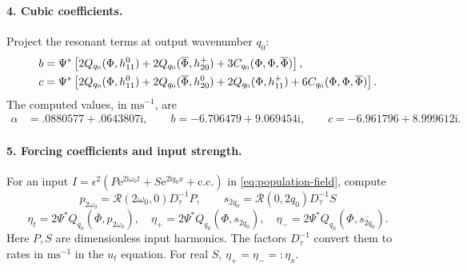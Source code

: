 \documentclass[11pt]{article}
\newcommand{\ii}{\mathrm{i}}
\newcommand{\ee}{\mathrm{e}}
\newcommand{\cR}{\mathcal{R}}
\newcommand{\cc}{\mathrm{c.c.}}
\begin{document}
\paragraph{4. Cubic coefficients.}
Project the resonant terms at output wavenumber $q_0$:
\begin{align}
 b={}&\Psi^*\left[2Q_{q_0}(\Phi,h_{11}^0)
       +2Q_{q_0}(\overline\Phi,h_{20}^+)
       +3C_{q_0}(\Phi,\Phi,\overline\Phi)\right],\notag\\
 c={}&\Psi^*\left[2Q_{q_0}(\Phi,h_{11}^0)
       +2Q_{q_0}(\overline\Phi,h_{20}^0)
       +2Q_{q_0}(\Phi,h_{11}^+)
       +6C_{q_0}(\Phi,\Phi,\overline\Phi)\right].
 \label{eq:v1-cubic-computation}
\end{align}
The computed values, in $\mathrm{ms}^{-1}$, are
\begin{equation}
 \begin{split}
 \alpha&=.0880577+.0643807\ii,\qquad 
 b=-6.706479+9.069454\ii,\qquad
 c=-6.961796+8.999612\ii.
 \end{split}
 \label{eq:v1-computed-coefficients}
\end{equation}

\paragraph{5. Forcing coefficients and input strength.}
For an input
$I=\epsilon^2(P\ee^{2\ii\omega_0t}+S\ee^{2\ii q_0x}+\cc)$
in \eqref{eq:population-field}, compute
\begin{equation}
      p_{2\omega_0}=\cR(2\omega_0,0)D_\tau^{-1}P,\qquad 
 s_{2q_0}=\cR(0,2q_0)D_\tau^{-1}S
\end{equation}
\begin{equation}
      \eta_t=2\Psi^*Q_{q_0}(\overline\Phi,p_{2\omega_0}),\quad
 \eta_+=2\Psi^*Q_{q_0}(\Phi,s_{2q_0}),\quad
 \eta_-=2\Psi^*Q_{q_0}(\Phi,\overline{s_{2q_0}}).
\end{equation}
Here $P,S$ are dimensionless input harmonics. The factors $D_\tau^{-1}$
convert them to rates in $\mathrm{ms}^{-1}$ in the $u_t$ equation.
For real $S$, $\eta_+=\eta_-=: \eta_x$. 
\end{document}
